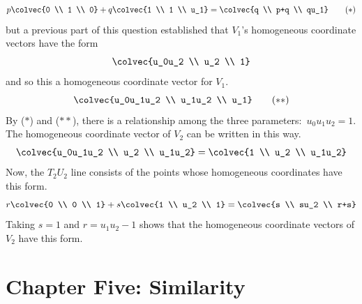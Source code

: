 \begin{ans}{7}
\begin{exparts}
           \begin{equation*}
             p\colvec{0 \\ 1 \\ 0}+q\colvec{1 \\ 1 \\ u_1}
             =\colvec{q \\ p+q \\ qu_1}
           \tag*{($*$)}\end{equation*}
           but a previous part of this question established that $V_1$'s
           homogeneous coordinate vectors have the form
           \begin{equation*}
            \colvec{u_0u_2 \\ u_2 \\ 1}
           \end{equation*}
           and so this a homogeneous coordinate vector for $V_1$.
           \begin{equation*}
             \colvec{u_0u_1u_2 \\ u_1u_2 \\ u_1}
           \tag*{($**$)}\end{equation*}
           By ($*$) and ($**$), there is a
           relationship among the three parameters:~$u_0u_1u_2=1$.
         \partsitem
           The homogeneous coordinate vector of $V_2$ can be written
           in this way.
           \begin{equation*}
             \colvec{u_0u_1u_2 \\ u_2 \\ u_1u_2}
             =\colvec{1 \\ u_2 \\ u_1u_2}
           \end{equation*}
           Now, the $T_2U_2$ line consists of the points whose homogeneous
           coordinates have this form.
           \begin{equation*}
             r\colvec{0 \\ 0 \\ 1}+s\colvec{1 \\ u_2 \\ 1}
             =\colvec{s \\ su_2 \\ r+s}
           \end{equation*}
           Taking $s=1$ and $r=u_1u_2-1$ shows that the
           homogeneous coordinate vectors of $V_2$ have this form.
      \end{exparts}
    
\end{ans}
\chapter{Chapter Five: Similarity}
